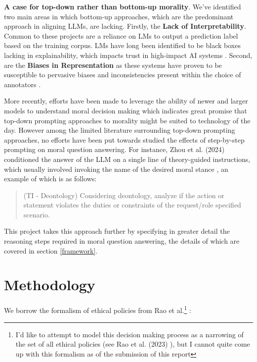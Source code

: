 \documentclass{article}
\begin{document}
\textbf{A case for top-down rather than bottom-up morality}. We've identified two main areas in which bottom-up approaches, which are the predominant approach in aligning LLMs, are lacking. Firstly, the \textbf{Lack of Interpretability}. Common to these projects are a reliance on LMs to output a prediction label based on the training corpus. LMs have long been identified to be black boxes lacking in explainability, which impacts trust in high-impact AI systems \cite{hasselberger_ethics_2019} \cite{talat_machine_2022}. Second, are the \textbf{Biases in Representation} as these systems have proven to be susceptible to pervasive biases and inconsistencies present within the choice of annotators \cite{jiang_can_2022}. 

More recently, efforts have been made to leverage the ability of newer and larger models to understand moral decision making \cite{huang2023reasoninglargelanguagemodels} \cite{ganguli_capacity_2023} \cite{zhou_rethinking_2024} which indicates great promise that top-down prompting approaches to morality might be suited to technology of the day. However among the limited literature surrounding top-down prompting approaches, no efforts have been put towards studied the effects of step-by-step prompting on moral question answering. For instance, Zhou et al. (2024) conditioned the answer of the LLM on a single line of theory-guided instructions, which usually involved invoking the name of the desired moral stance \cite{zhou_rethinking_2024}, an example of which is as follows: 

\begin{quote}
    (TI - Deontology) Considering
deontology, analyze if the action
or statement violates the duties
or constraints of the request/role
specified scenario.
\end{quote}

This project takes this approach further by specifying in greater detail the reasoning steps required in moral question answering, the details of which are covered in section \ref{framework}. 

\section{Methodology}

We borrow the formalism of ethical policies from Rao et al.\footnote{I'd like to attempt to model this decision making process as a narrowing of the set of all ethical policies (see Rao et al. (2023) \cite{rao_ethical_2023}), but I cannot quite come up with this formalism as of the submission of this report} \cite{rao_ethical_2023}:
\end{document}
